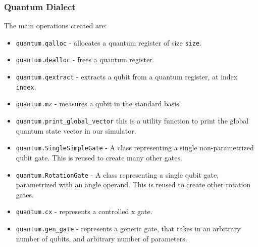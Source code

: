 \subsubsection{Quantum Dialect}
The main operations created are:
 \begin{itemize}
    \item \texttt{quantum.qalloc} - allocates a quantum register of size
    \texttt{size}.
    \item \texttt{quantum.dealloc} - frees a quantum register.
    \item \texttt{quantum.qextract} - extracts a qubit from a quantum register,
    at index \texttt{index}.
    \item \texttt{quantum.mz} - measures a qubit in the standard basis.
    \item \texttt{quantum.print\_global\_vector} this is a utility function to
    print the global quantum state vector in our simulator.
    \item \texttt{quantum.SingleSimpleGate} - A class representing a single
    non-parametrized qubit gate. This is reused to create many other gates.
    \item \texttt{quantum.RotationGate} - A class representing a single qubit
    gate, parametrized with an angle operand. This is reused to create other
    rotation gates.
    \item \texttt{quantum.cx} - represents a controlled x gate.
    \item \texttt{quantum.gen\_gate} - represents a generic gate, that takes in
    an arbitrary number of qubits, and arbitrary number of parameters.
\end{itemize}
